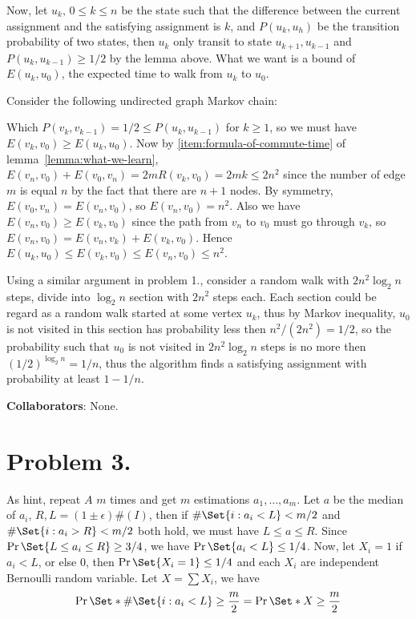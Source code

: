 \documentclass[12pt, a4paper]{article}
\begin{document}
Now, let $u_k, \, 0 \leq k \leq n$ be the state such that the difference between the current assignment
and the satisfying assignment is $k$, and $P(u_k, u_h)$ be the transition probability
of two states, then $u_k$ only transit to state $u_{k+1}, u_{k-1}$ and
$P(u_k, u_{k-1}) \geq 1/2$ by the lemma above.
What we want is a bound of $E(u_k, u_0)$, the expected time to walk from $u_k$ to $u_0$.

Consider the following undirected graph Markov chain:
\begin{figure}[H]
  \centering
\end{figure}
Which $P(v_k, v_{k-1}) = 1/2 \leq P(u_k, u_{k-1})$ for $k \geq 1$,
so we must have $E(v_k, v_0) \geq E(u_k, u_0)$.
Now by \ref{item:formula-of-commute-time} of lemma~\ref{lemma:what-we-learn},
$E(v_n, v_0) + E(v_0, v_n) = 2 m R(v_k, v_0) = 2 mk \leq 2 n^2$ since the number of edge $m$
is equal $n$ by the fact that there are $n+1$ nodes.
By symmetry, $E(v_0, v_n) = E(v_n, v_0)$, so $E(v_n, v_0) = n^2$.
Also we have $E(v_n, v_0) \geq E(v_k, v_0)$ since the path
from $v_n$ to $v_0$ must go through $v_k$, so $E(v_n, v_0) = E(v_n, v_k) + E(v_k, v_0)$.
Hence $E(u_k, u_0) \leq E(v_k, v_0) \leq E(v_n, v_0) \leq n^2$.

Using a similar argument in problem 1., consider a random walk with $2n^2 \log_2 n$
steps, divide into $\log_2 n$ section with $2 n^2$ steps each.
Each section could be regard as a random walk started at some vertex $u_k$,
thus by Markov inequality, $u_0$ is not visited in this section
has probability less then $n^2 / (2 n^2) = 1/2$, so the probability
such that $u_0$ is not visited in $2 n^2 \log_2 n$ steps is no more then
$(1/2)^{\log_2 n} = 1/n$, thus the algorithm finds a satisfying
assignment with probability at least $1 - 1/n$.

{\bf Collaborators}: None.

\section{Problem 3.}
As hint, repeat $A$ $m$ times and get $m$ estimations $a_1, \dots, a_m$.
Let $a$ be the median of $a_i$, $R, L = (1 \pm \epsilon) \#(I)$,
then if $\# \Set{i : a_i < L} < m/2$
and $\# \Set{i: a_i > R} < m/2$ both hold, we must have $L \leq a \leq R$.
Since $\Pr\Set{L \leq a_i \leq R} \geq 3/4$, we have $\Pr\Set{a_i < L} \leq 1/4$.
Now, let $X_i = 1$ if $a_i < L$, or else $0$, then $\Pr\Set{X_i = 1} \leq 1/4$ and
each $X_i$ are independent Bernoulli random variable.
Let $X = \sum X_i$, we have
\[ \Pr\Set*{\# \Set{i: a_i < L} \geq \frac{m}{2} } = \Pr\Set*{ X \geq \frac{m}{2} } \]
\end{document}
